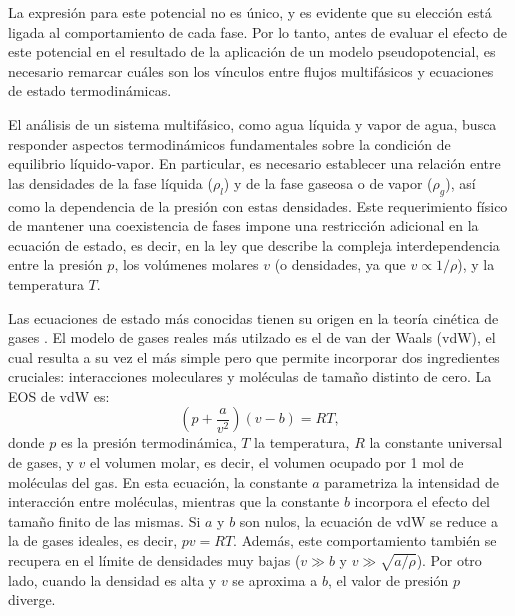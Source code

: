 La expresi\'on para este potencial no es \'unico, y es evidente que su elecci\'on est\'a ligada al comportamiento de cada fase. Por lo tanto, antes de evaluar el efecto de este potencial en el resultado de la aplicaci\'on de un modelo pseudopotencial, es necesario remarcar cu\'ales son los v\'inculos entre flujos multif\'asicos y ecuaciones de estado termodin\'amicas.

El an\'alisis de un sistema multif\'asico, como agua l\'iquida y vapor de agua, busca responder aspectos termodin\'amicos fundamentales sobre la condici\'on de equilibrio l\'iquido-vapor. En particular, es necesario establecer una relaci\'on entre las densidades de la fase l\'iquida ($\rho_l$) y de la fase gaseosa o de vapor ($\rho_g$), as\'i como la dependencia de la presi\'on con estas densidades. Este requerimiento f\'isico de mantener una coexistencia de fases impone una restricci\'on adicional en la ecuaci\'on de estado, es decir, en la ley que describe la compleja interdependencia entre la presi\'on $p$, los vol\'umenes molares $v$ (o densidades, ya que $v \propto 1/\rho$), y la temperatura $T$. 

Las ecuaciones de estado m\'as conocidas tienen su origen en la teor\'ia cin\'etica de gases \cite{blundell_concepts_2006}. El modelo de gases reales m\'as utilzado es el de van der Waals (vdW), el cual resulta a su vez el m\'as simple pero que permite incorporar dos ingredientes cruciales: interacciones moleculares y mol\'eculas de tama\~no distinto de cero. La EOS de vdW es:
\begin{equation}
	\left( p + \dfrac{a}{v^2} \right) \left( v-b \right) = RT,
\end{equation}
donde $p$ es la presi\'on termodin\'amica, $T$ la temperatura, $R$ la constante universal de gases, y $v$ el volumen molar, es decir, el volumen ocupado por 1 mol de mol\'eculas del gas. En esta ecuaci\'on, la constante $a$ parametriza la intensidad de interacci\'on entre mol\'eculas, mientras que la constante $b$ incorpora el efecto del tama\~no finito de las mismas. Si $a$ y $b$ son nulos, la ecuaci\'on de vdW se reduce a la de gases ideales, es decir, $pv = RT$. Adem\'as, este comportamiento tambi\'en se recupera en el l\'imite de densidades muy bajas ($v \gg b$ y $v \gg \sqrt{a/\rho}$). Por otro lado, cuando la densidad es alta y $v$ se aproxima a $b$, el valor de presi\'on $p$ diverge.


